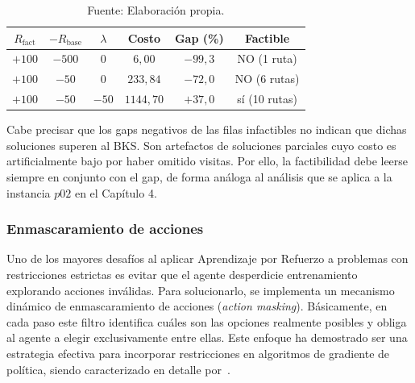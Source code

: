 \begin{table}[H]
    \centering
    \renewcommand{\arraystretch}{1.15}
    \setlength{\tabcolsep}{6pt}
    \begin{tabular}{@{}cccccc@{}}
        \toprule
        $R_{\text{fact}}$ & $-R_{\text{base}}$ & $\lambda$ & \textbf{Costo} & \textbf{Gap (\%)} & \textbf{Factible} \\
        \midrule
        $+100$ & $-500$ & $0$   & $6{,}00$    & $-99{,}3$ & NO (1 ruta) \\
        $+100$ & $-50$  & $0$   & $233{,}84$  & $-72{,}0$ & NO (6 rutas) \\
        $+100$ & $-50$  & $-50$ & $1144{,}70$ & $+37{,}0$ & sí (10 rutas) \\
        \bottomrule
    \end{tabular}
    \caption{\label{tab:reward-hacking-p04} Replicación del barrido de recompensa terminal sobre la instancia $p04$ (semilla 0, $75$ clientes).}
    \caption*{Fuente: Elaboración propia.}
\end{table}

Cabe precisar que los gaps negativos de las filas infactibles no indican que dichas soluciones superen al BKS. Son artefactos de soluciones parciales cuyo costo es artificialmente bajo por haber omitido visitas. Por ello, la factibilidad debe leerse siempre en conjunto con el gap, de forma análoga al análisis que se aplica a la instancia $p02$ en el Capítulo 4.

\subsubsection{Enmascaramiento de acciones} \label{sec:enmascaramientodeacciones}
Uno de los mayores desafíos al aplicar Aprendizaje por Refuerzo a problemas con restricciones estrictas es evitar que el agente desperdicie entrenamiento explorando acciones inválidas. Para solucionarlo, se implementa un mecanismo dinámico de enmascaramiento de acciones (\textit{action masking}). Básicamente, en cada paso este filtro identifica cuáles son las opciones realmente posibles y obliga al agente a elegir exclusivamente entre ellas. Este enfoque ha demostrado ser una estrategia efectiva para incorporar restricciones en algoritmos de gradiente de política, siendo caracterizado en detalle por~\cite{HuangOntanon2020}.


